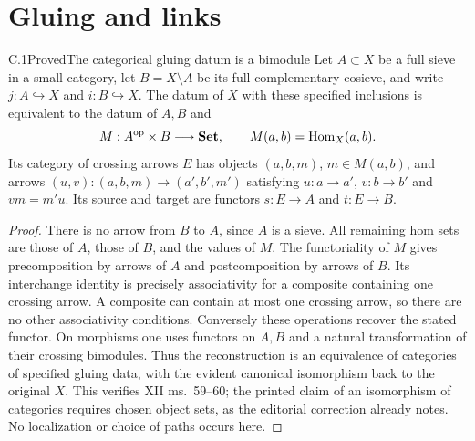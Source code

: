\section{Gluing and links}

\begin{statement}{C.1}{Proved}{The categorical gluing datum is a bimodule}
Let $A\subset X$ be a full sieve in a small category, let $B=X\setminus A$ be its full complementary cosieve, and write $j:A\hookrightarrow X$ and $i:B\hookrightarrow X$. The datum of $X$ with these specified inclusions is equivalent to the datum of $A,B$ and
\[
 M:A^{\mathrm{op}}\times B\longrightarrow\mathbf{Set},
 \qquad M(a,b)=\operatorname{Hom}_X(a,b).
\]
Its category of crossing arrows $E$ has objects $(a,b,m)$, $m\in M(a,b)$, and arrows $(u,v):(a,b,m)\to(a',b',m')$ satisfying $u:a\to a'$, $v:b\to b'$ and $vm=m'u$. Its source and target are functors $s:E\to A$ and $t:E\to B$.
\end{statement}
\begin{proof}
There is no arrow from $B$ to $A$, since $A$ is a sieve. All remaining hom sets are those of $A$, those of $B$, and the values of $M$. The functoriality of $M$ gives precomposition by arrows of $A$ and postcomposition by arrows of $B$. Its interchange identity is precisely associativity for a composite containing one crossing arrow. A composite can contain at most one crossing arrow, so there are no other associativity conditions. Conversely these operations recover the stated functor. On morphisms one uses functors on $A,B$ and a natural transformation of their crossing bimodules. Thus the reconstruction is an equivalence of categories of specified gluing data, with the evident canonical isomorphism back to the original $X$. This verifies XII ms.~59--60; the printed claim of an isomorphism of categories requires chosen object sets, as the editorial correction already notes. No localization or choice of paths occurs here.
\end{proof}

